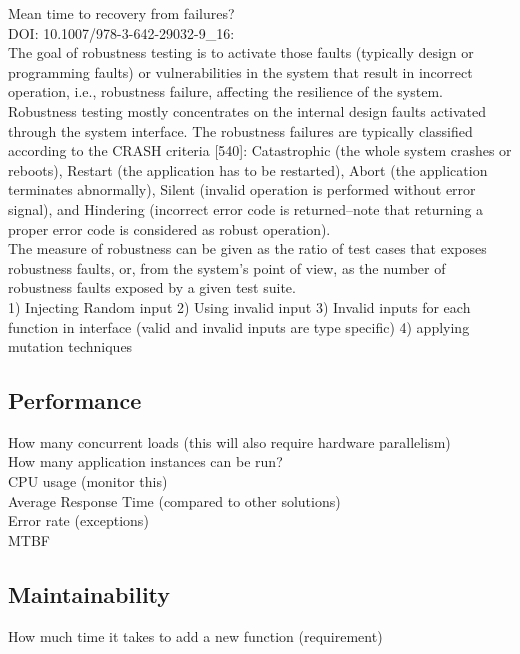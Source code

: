 \documentclass{article}
\begin{document}
Mean time to recovery from failures?\\  


DOI: 10.1007/978-3-642-29032-9\_16:\\ 


The goal of robustness testing is to activate those faults (typically design or programming faults) or vulnerabilities in the system that result in incorrect operation, i.e., robustness failure, affecting the resilience of the system. Robustness testing mostly concentrates on the internal design faults activated through the system interface. The robustness failures are typically classified according to the CRASH criteria [540]: Catastrophic (the whole system crashes or reboots), Restart (the application has to be restarted), Abort (the application terminates abnormally), Silent (invalid operation is performed without error signal), and Hindering (incorrect error code is returned–note that returning a proper error code is considered as robust operation).\\ 


The measure of robustness can be given as the ratio of test cases that exposes robustness faults, or, from the system’s point of view, as the number of robustness faults exposed by a given test suite.\\ 


1) Injecting Random input 
2) Using invalid input 
3) Invalid inputs for each function in interface (valid and invalid inputs are type specific) 
4) applying mutation techniques 
\subsection{Performance}
How many concurrent loads (this will also require hardware parallelism)\\ 

How many application instances can be run?\\ 

CPU usage (monitor this)\\ 

Average Response Time (compared to other solutions)\\ 

Error rate (exceptions)\\ 

MTBF 
\subsection{Maintainability}
How much time it takes to add a new function (requirement)\\ 
\end{document}
